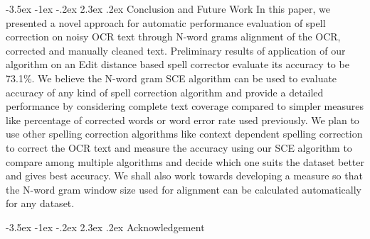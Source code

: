 \documentclass[12pt]{article}
\makeatletter
\renewcommand\section{\@startsection{section}{1}{\z@}%
                                  {-3.5ex \@plus -1ex \@minus -.2ex}%
                                  {2.3ex \@plus.2ex}%
                                  {\normalfont\bfseries}}
\makeatother
\begin{document}
\section{Conclusion and Future Work}
\label{spell:fw}
In this paper, we presented a novel approach for automatic performance evaluation of spell correction on noisy OCR text through N-word grams alignment of the OCR, corrected and manually cleaned text. Preliminary results of application of our algorithm on an Edit distance based spell corrector evaluate its accuracy to be 73.1\%. We believe the N-word gram SCE algorithm can be used to evaluate accuracy of any kind of spell correction algorithm and provide a detailed performance by considering complete text coverage compared to simpler measures like percentage of corrected words or word error rate used previously. We plan to use other spelling correction algorithms like context dependent spelling correction to correct the OCR text and measure the accuracy using our SCE algorithm to compare among multiple algorithms and decide which one suits the dataset better and gives best accuracy. We shall also work towards developing a measure so that the N-word gram window size used for alignment can be calculated automatically for any dataset.


\section{Acknowledgement}










\end{document}
